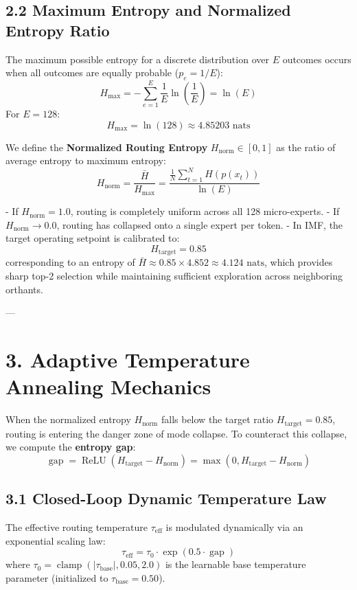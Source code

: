 \documentclass[11pt,twoside,openright]{amsbook}
\begin{document}
{{{{{{{{{{\subsection{2.2 Maximum Entropy and Normalized Entropy Ratio}

The maximum possible entropy for a discrete distribution over $E$ outcomes occurs when all outcomes are equally probable ($p_e = 1/E$):
$$H_{\max} = - \sum_{e=1}^E \frac{1}{E} \ln\left(\frac{1}{E}\right) = \ln(E)$$
For $E = 128$:
$$H_{\max} = \ln(128) \approx 4.85203 \text{ nats}$$

We define the \textbf{Normalized Routing Entropy} $H_{\text{norm}} \in [0, 1]$ as the ratio of average entropy to maximum entropy:
$$H_{\text{norm}} = \frac{\bar{H}}{H_{\max}} = \frac{\frac{1}{N} \sum_{t=1}^N H(p(x_t))}{\ln(E)}$$

- If $H_{\text{norm}} = 1.0$, routing is completely uniform across all 128 micro-experts.
- If $H_{\text{norm}} \to 0.0$, routing has collapsed onto a single expert per token.
- In IMF, the target operating setpoint is calibrated to:
  $$H_{\text{target}} = 0.85$$
  corresponding to an entropy of $\bar{H} \approx 0.85 \times 4.852 \approx 4.124\text{ nats}$, which provides sharp top-2 selection while maintaining sufficient exploration across neighboring orthants.

---

\section{3. Adaptive Temperature Annealing Mechanics}

When the normalized entropy $H_{\text{norm}}$ falls below the target ratio $H_{\text{target}} = 0.85$, routing is entering the danger zone of mode collapse. To counteract this collapse, we compute the \textbf{entropy gap}:
$$\operatorname{gap} = \operatorname{ReLU}(H_{\text{target}} - H_{\text{norm}}) = \max(0, H_{\text{target}} - H_{\text{norm}})$$

\subsection{3.1 Closed-Loop Dynamic Temperature Law}

The effective routing temperature $\tau_{\text{eff}}$ is modulated dynamically via an exponential scaling law:
$$\tau_{\text{eff}} = \tau_0 \cdot \exp(0.5 \cdot \operatorname{gap})$$
where $\tau_0 = \operatorname{clamp}(|\tau_{\text{base}}|, 0.05, 2.0)$ is the learnable base temperature parameter (initialized to $\tau_{\text{base}} = 0.50$).

}}}}}}}}}}
\end{document}
